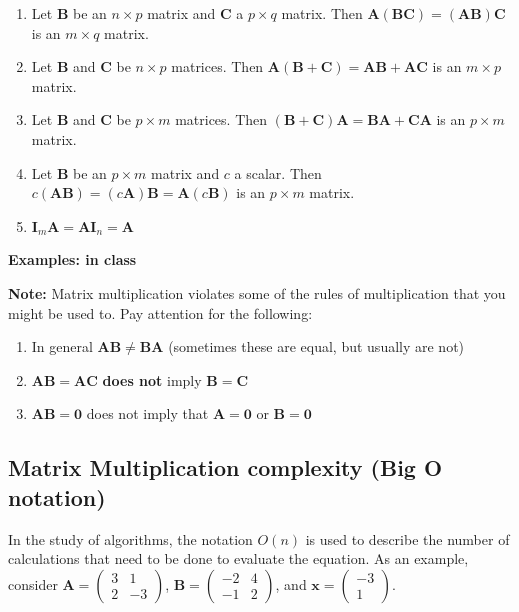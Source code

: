 \documentclass[
]{book}
\theoremstyle{definition}
\theoremstyle{definition}
\theoremstyle{definition}
\theoremstyle{remark}
\begin{document}
\begin{enumerate}
\def\labelenumi{\arabic{enumi})}
\item
  Let \(\mathbf{B}\) be an \(n \times p\) matrix and \(\mathbf{C}\) a \(p \times q\) matrix. Then \(\mathbf{A}(\mathbf{B}\mathbf{C}) = (\mathbf{A}\mathbf{B})\mathbf{C}\) is an \(m \times q\) matrix.
\item
  Let \(\mathbf{B}\) and \(\mathbf{C}\) be \(n \times p\) matrices. Then \(\mathbf{A}(\mathbf{B} + \mathbf{C}) = \mathbf{A}\mathbf{B} + \mathbf{A}\mathbf{C}\) is an \(m \times p\) matrix.
\item
  Let \(\mathbf{B}\) and \(\mathbf{C}\) be \(p \times m\) matrices. Then \((\mathbf{B} + \mathbf{C})\mathbf{A} = \mathbf{B}\mathbf{A} + \mathbf{C}\mathbf{A}\) is an \(p \times m\) matrix.
\item
  Let \(\mathbf{B}\) be an \(p \times m\) matrix and \(c\) a scalar. Then \(c(\mathbf{A} \mathbf{B}) = (c \mathbf{A}) \mathbf{B} = \mathbf{A}(c\mathbf{B})\) is an \(p \times m\) matrix.
\item
  \(\mathbf{I}_m \mathbf{A} = \mathbf{A} \mathbf{I}_n = \mathbf{A}\)
\end{enumerate}

\textbf{Examples: in class}

\textbf{Note:} Matrix multiplication violates some of the rules of multiplication that you might be used to. Pay attention for the following:

\begin{enumerate}
\def\labelenumi{\arabic{enumi})}
\item
  In general \(\mathbf{A} \mathbf{B} \neq \mathbf{B} \mathbf{A}\) (sometimes these are equal, but usually are not)
\item
  \(\mathbf{A}\mathbf{B} = \mathbf{A} \mathbf{C}\) \textbf{does not} imply \(\mathbf{B} = \mathbf{C}\)
\item
  \(\mathbf{A}\mathbf{B} = \mathbf{0}\) does not imply that \(\mathbf{A} = \mathbf{0}\) or \(\mathbf{B} = \mathbf{0}\)
\end{enumerate}

\hypertarget{matrix-multiplication-complexity-big-o-notation}{%
\subsection{Matrix Multiplication complexity (Big O notation)}\label{matrix-multiplication-complexity-big-o-notation}}

In the study of algorithms, the notation \(O(n)\) is used to describe the number of calculations that need to be done to evaluate the equation. As an example, consider \(\mathbf{A} = \begin{pmatrix}3 & 1 \\ 2 & -3 \end{pmatrix}\), \(\mathbf{B} = \begin{pmatrix} -2 & 4 \\ -1 & 2 \end{pmatrix}\), and \(\mathbf{x} = \begin{pmatrix} -3 \\ 1 \end{pmatrix}\).
\end{document}
